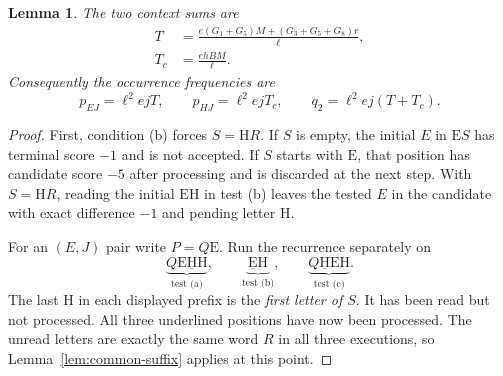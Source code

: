 \documentclass[11pt,a4paper]{article}
\newtheorem{lemma}[theorem]{Lemma}
\theoremstyle{definition}
\theoremstyle{remark}
\newcommand{\E}{\mathrm E}
\newcommand{\HH}{\mathrm H}
\begin{document}
\begin{lemma}\label{lem:pairreduction}
The two context sums are
\begin{align}\label{eq:Tclosed}
T&=\frac{e(G_1+G_5)M+(G_3+G_5+G_8)r}{\ell},\\
T_c&=\frac{ehBM}{\ell}.\label{eq:Tcclosed}
\end{align}
Consequently the occurrence frequencies are
\begin{equation}\label{eq:q2closed}
p_{EJ}=\ell^2ejT,\qquad p_{HJ}=\ell^2ejT_c,\qquad q_2=\ell^2ej(T+T_c).
\end{equation}
\end{lemma}
\begin{proof}
First, condition (b) forces $S=\HH R$. If $S$ is empty, the initial $E$ in $\E S$ has terminal score $-1$ and is not accepted. If $S$ starts with $\E$, that position has candidate score $-5$ after processing and is discarded at the next step. With $S=\HH R$, reading the initial $\E\HH$ in test (b) leaves the tested $E$ in the candidate with exact difference $-1$ and pending letter $\HH$.

For an $(E,J)$ pair write $P=Q\E$. Run the recurrence separately on
\[
\underbrace{Q\E\underline{\HH}\HH}_{\text{test (a)}},\qquad
\underbrace{\underline{\E}\HH}_{\text{test (b)}},\qquad
\underbrace{Q\underline{\HH}\E\HH}_{\text{test (c)}}.
\]
The last $\HH$ in each displayed prefix is the \emph{first letter of $S$}. It has been read but not processed. All three underlined positions have now been processed. The unread letters are exactly the same word $R$ in all three executions, so Lemma~\ref{lem:common-suffix} applies at this point.


\end{proof}
\end{document}
